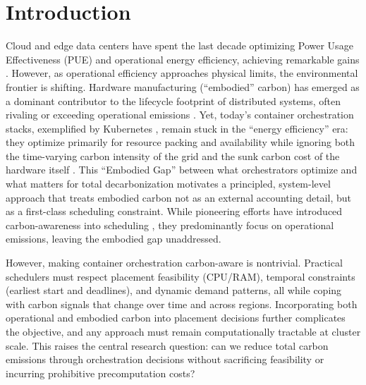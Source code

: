 \documentclass[10pt,journal,compsoc]{IEEEtran}
\begin{document}
\section{Introduction}

Cloud and edge data centers have spent the last decade optimizing Power Usage Effectiveness (PUE) and operational energy efficiency, achieving remarkable gains \cite{Masanet2020Science}. However, as operational efficiency approaches physical limits, the environmental frontier is shifting. Hardware manufacturing (``embodied'' carbon) has emerged as a dominant contributor to the lifecycle footprint of distributed systems, often rivaling or exceeding operational emissions \cite{cao2024}. Yet, today’s container orchestration stacks, exemplified by Kubernetes \cite{k8s}, remain stuck in the ``energy efficiency'' era: they optimize primarily for resource packing and availability while ignoring both the time-varying carbon intensity of the grid and the sunk carbon cost of the hardware itself \cite{Ember2024GlobalElectricity}. This ``Embodied Gap'' between what orchestrators optimize and what matters for total decarbonization motivates a principled, system-level approach that treats embodied carbon not as an external accounting detail, but as a first-class scheduling constraint. While pioneering efforts have introduced carbon-awareness into scheduling \cite{Google2020CarbonIntelligent, gu2023}, they predominantly focus on operational emissions, leaving the embodied gap unaddressed.

However, making container orchestration carbon-aware is nontrivial. Practical schedulers must respect placement feasibility (CPU/RAM), temporal constraints (earliest start and deadlines), and dynamic demand patterns, all while coping with carbon signals that change over time and across regions. Incorporating both operational and embodied carbon into placement decisions further complicates the objective, and any approach must remain computationally tractable at cluster scale. This raises the central research question: can we reduce total carbon emissions through orchestration decisions without sacrificing feasibility or incurring prohibitive precomputation costs?
\end{document}

